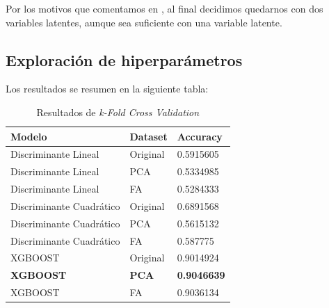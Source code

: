 \documentclass[11pt]{article}
\begin{document}
Por los motivos que comentamos en , al final decidimos quedarnos con dos variables latentes, aunque sea suficiente con una variable latente.

\subsection{Exploración de hiperparámetros}

Los resultados se resumen en la siguiente tabla:

\begin{table}[H]
\begin{tabular}{|l|l|l|}
    Modelo                   & Dataset      & Accuracy      \\
    \hline
    Discriminante Lineal     & Original     & 0.5915605     \\
    Discriminante Lineal     & PCA          & 0.5334985     \\
    Discriminante Lineal     & FA           & 0.5284333     \\
    Discriminante Cuadrático & Original     & 0.6891568     \\
    Discriminante Cuadrático & PCA          & 0.5615132     \\
    Discriminante Cuadrático & FA           & 0.587775      \\
    XGBOOST                  & Original     & 0.9014924     \\
    \textbf{XGBOOST}         & \textbf{PCA} & \textbf{0.9046639} \\
    XGBOOST                  & FA           & 0.9036134     \\

\end{tabular}
\caption{Resultados de \textit{k-Fold Cross Validation}}
\end{table}




\newpage


\newpage


\newpage

\pagebreak





\end{document}
